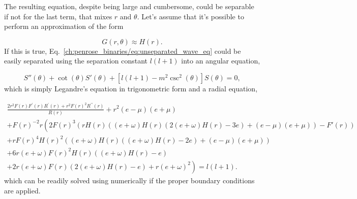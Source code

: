The resulting equation, despite being large and cumbersome, could be separable if not for the last term, that mixes $r$ and $\theta$. Let's assume that it's possible to perform an approximation of the form

\begin{equation}
  G(r,\theta) \approx H(r).
  \label{ch:penrose_binaries/eq:approx_for_g}
\end{equation}
%
If this is true, Eq.~\eqref{ch:penrose_binaries/eq:unseparated_wave_eq} could be easily separated using the separation constant $l(l+1)$ into an angular equation,

\begin{equation}
  S''(\theta ) + \cot (\theta ) S'(\theta )+ [l(l+1) - m^2 \csc ^2(\theta )]S(\theta) = 0,
  \label{ch:penrose_binaries/eq:sep_ang_eq}
\end{equation}
%
which is simply Legandre's equation in trigonometric form and a radial equation,

\begin{multline}
  \frac{2 r^2 F(r) F^{\prime}(r) R^{\prime}(r)+r^2 F(r)^2 R^{\prime\prime}(r)}{R(r)} + r^2 (e-\mu ) (e+\mu ) \\
  + F(r)^{-2}r \left(2 F(r)^3 \left(r H(r) ((e+\omega ) H(r) (2 (e+\omega ) H(r)-3 e)+(e-\mu ) (e+\mu ))-F'(r)\right) \right. \\
  +r F(r)^4 H(r)^2 ((e+\omega ) H(r) ((e+\omega ) H(r)-2 e)+(e-\mu ) (e+\mu ))\\
  +6 r (e+\omega ) F(r)^2 H(r) ((e+\omega ) H(r)-e)\\
  \left. +2 r (e+\omega ) F(r) (2 (e+\omega ) H(r)-e)+r (e+\omega )^2\right) = l(l+1).
  \label{ch:penrose_binaries/eq:sep_rad_eq}
\end{multline}
%
which can be readily solved using numerically if the proper boundary conditions are applied.

